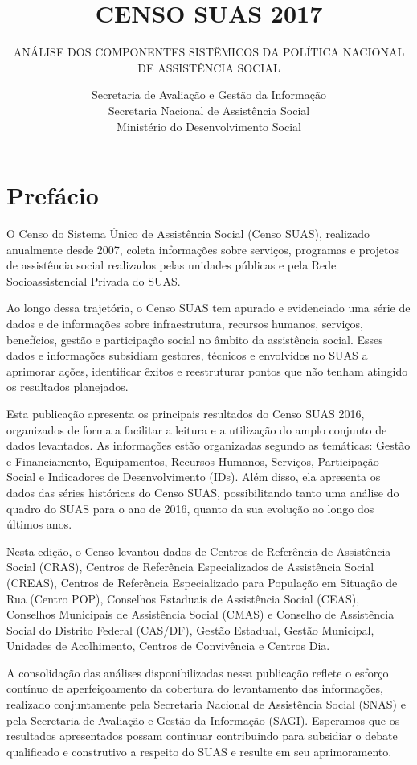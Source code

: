 \documentclass[brazilian]{report}
\title{CENSO SUAS 2017}
\subtitle{ANÁLISE DOS COMPONENTES SISTÊMICOS DA POLÍTICA NACIONAL DE ASSISTÊNCIA SOCIAL}
\date{}
\author{Secretaria de Avaliação e Gestão da Informação\\
        Secretaria Nacional de Assistência Social\\
        Ministério do Desenvolvimento Social}
\begin{document}
\maketitle

\chapter*{Prefácio}
 
O Censo do Sistema Único de Assistência Social (Censo SUAS), realizado anualmente desde 2007, coleta informações sobre serviços, programas e projetos de assistência social realizados pelas unidades públicas e pela Rede Socioassistencial Privada do SUAS.

Ao longo dessa trajetória, o Censo SUAS tem apurado e evidenciado uma série de dados e de informações sobre infraestrutura, recursos humanos, serviços, benefícios, gestão e participação social no âmbito da assistência social. Esses dados e informações subsidiam gestores, técnicos e envolvidos no SUAS a aprimorar ações, identificar êxitos e reestruturar pontos que não tenham atingido os resultados planejados.

Esta publicação apresenta os principais resultados do Censo SUAS 2016, organizados de forma a facilitar a leitura e a utilização do amplo conjunto de dados levantados. As informações estão organizadas segundo as temáticas: Gestão e Financiamento, Equipamentos, Recursos Humanos, Serviços, Participação Social e Indicadores de Desenvolvimento (IDs). Além disso, ela apresenta os dados das séries históricas do Censo SUAS, possibilitando tanto uma análise do quadro do SUAS para o ano de 2016, quanto da sua evolução ao longo dos últimos anos.

Nesta edição, o Censo levantou dados de Centros de Referência de Assistência Social (CRAS), Centros de Referência Especializados de Assistência Social (CREAS), Centros de Referência Especializado para População em Situação de Rua (Centro POP), Conselhos Estaduais de Assistência Social (CEAS), Conselhos Municipais de Assistência Social (CMAS) e Conselho de Assistência Social do Distrito Federal (CAS/DF), Gestão Estadual, Gestão Municipal, Unidades de Acolhimento, Centros de Convivência e Centros Dia.

A consolidação das análises disponibilizadas nessa publicação reflete o esforço contínuo de aperfeiçoamento da cobertura do levantamento das informações, realizado conjuntamente pela Secretaria Nacional de Assistência Social (SNAS) e pela Secretaria de Avaliação e Gestão da Informação (SAGI). Esperamos que os resultados apresentados possam continuar contribuindo para subsidiar o debate qualificado e construtivo a respeito do SUAS e resulte em seu aprimoramento.
\end{document}
